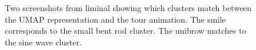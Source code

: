 \documentclass[
  letterpaper,
]{krantz}
\begin{document}
\begin{figure}

\begin{minipage}{\linewidth}



\end{minipage}%
\newline
\begin{minipage}{\linewidth}



\end{minipage}%

\caption{\label{fig-liminal-clusters-nonlin}Two screenshots from liminal
showing which clusters match between the UMAP representation and the
tour animation. The smile corresponds to the small bent rod cluster. The
unibrow matches to the sine wave cluster.}

\end{figure}%
\end{document}
